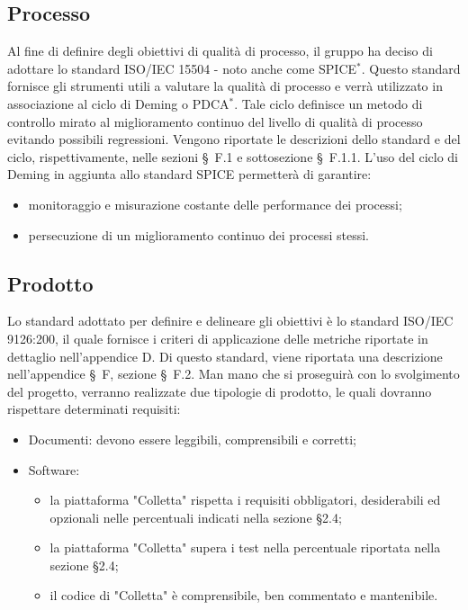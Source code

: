 \subsection{Processo}
Al fine di definire degli obiettivi di qualità di processo, il gruppo ha deciso di adottare lo standard ISO/IEC 15504 - noto anche come SPICE$^*$. Questo standard fornisce gli strumenti utili a valutare la qualità di processo e verrà utilizzato in associazione al ciclo di Deming o PDCA$^*$. Tale ciclo definisce un metodo di controllo mirato al miglioramento continuo del livello di qualità di processo evitando possibili regressioni. 
Vengono riportate le descrizioni dello standard e del ciclo, rispettivamente, nelle sezioni \S\ F.1 e sottosezione \S\ F.1.1. 
L'uso del ciclo di Deming in aggiunta allo standard SPICE permetterà di garantire:
\begin{itemize}
	\item monitoraggio e misurazione costante delle performance dei processi;
	\item persecuzione di un miglioramento continuo dei processi stessi.
\end{itemize}

\subsection{Prodotto}
Lo standard adottato per definire e delineare gli obiettivi è lo standard ISO/IEC 9126:200, il quale fornisce i criteri di applicazione delle metriche riportate in dettaglio nell'appendice D. 
Di questo standard, viene riportata una descrizione nell'appendice \S\ F, sezione \S\ F.2.
Man mano che si proseguirà con lo svolgimento del progetto, verranno realizzate due tipologie di prodotto, le quali dovranno rispettare determinati requisiti:
\begin{itemize}
	\item Documenti: devono essere leggibili, comprensibili e corretti;
	\item Software: 
	\begin{itemize}
		\item la piattaforma "Colletta" rispetta i requisiti obbligatori, desiderabili ed opzionali nelle percentuali indicati nella sezione \S2.4;
		\item la piattaforma "Colletta" supera i test nella percentuale riportata nella sezione \S2.4;
		\item il codice di "Colletta" è comprensibile, ben commentato e mantenibile.
	\end{itemize}
\end{itemize}

